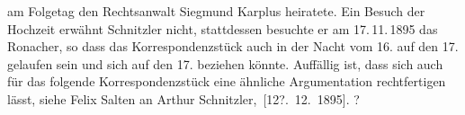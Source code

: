 \begin{ledgroupsized}[t]{13cm}
{{{                     am Folgetag 
                     den Rechtsanwalt Siegmund Karplus
                     heiratete. Ein Besuch der Hochzeit erwähnt Schnitzler nicht, stattdessen 
                     besuchte er am 17. 11. 1895 das Ronacher, so dass das Korrespondenzstück auch in der Nacht vom 16. auf den 17. gelaufen sein 
                     und sich auf den 17. beziehen könnte. Auffällig ist, dass sich auch für das folgende
                     Korrespondenzstück eine ähnliche Argumentation rechtfertigen lässt, siehe Felix Salten an Arthur Schnitzler, [12?. 12. 1895].
                  }}}\label{K_L03166-3h}?\pend
           
         
         \endnumbering{}\end{ledgroupsized}  \newcommand{\dateiname}{L03166}\newcommand{\titel}{Felix Salten an Arthur Schnitzler, [16. 11. 1895]}\newcommand{\editorInnen}{Martin Anton Müller und Laura Untner}
      